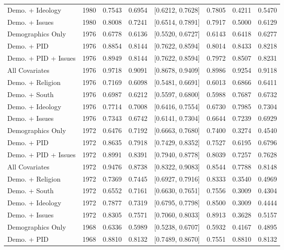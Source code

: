 \begin{longtable}{lrrrlrrr}
  Demo. + Ideology & 1980 & 0.7543 & 0.6954 & [0.6212, 0.7628] & 0.7805 & 0.4211 & 0.5470 \\ 
  Demo. + Issues & 1980 & 0.8008 & 0.7241 & [0.6514, 0.7891] & 0.7917 & 0.5000 & 0.6129 \\ 
  Demographics Only & 1976 & 0.6778 & 0.6136 & [0.5520, 0.6727] & 0.6143 & 0.6418 & 0.6277 \\ 
  Demo. + PID & 1976 & 0.8854 & 0.8144 & [0.7622, 0.8594] & 0.8014 & 0.8433 & 0.8218 \\ 
  Demo. + PID + Issues & 1976 & 0.8949 & 0.8144 & [0.7622, 0.8594] & 0.7972 & 0.8507 & 0.8231 \\ 
  All Covariates & 1976 & 0.9718 & 0.9091 & [0.8678, 0.9409] & 0.8986 & 0.9254 & 0.9118 \\ 
  Demo. + Religion & 1976 & 0.7169 & 0.6098 & [0.5481, 0.6691] & 0.6013 & 0.6866 & 0.6411 \\ 
  Demo. + South & 1976 & 0.6987 & 0.6212 & [0.5597, 0.6800] & 0.5988 & 0.7687 & 0.6732 \\ 
  Demo. + Ideology & 1976 & 0.7714 & 0.7008 & [0.6416, 0.7554] & 0.6730 & 0.7985 & 0.7304 \\ 
  Demo. + Issues & 1976 & 0.7343 & 0.6742 & [0.6141, 0.7304] & 0.6644 & 0.7239 & 0.6929 \\ 
  Demographics Only & 1972 & 0.6476 & 0.7192 & [0.6663, 0.7680] & 0.7400 & 0.3274 & 0.4540 \\ 
  Demo. + PID & 1972 & 0.8635 & 0.7918 & [0.7429, 0.8352] & 0.7527 & 0.6195 & 0.6796 \\ 
  Demo. + PID + Issues & 1972 & 0.8991 & 0.8391 & [0.7940, 0.8778] & 0.8039 & 0.7257 & 0.7628 \\ 
  All Covariates & 1972 & 0.9476 & 0.8738 & [0.8322, 0.9083] & 0.8544 & 0.7788 & 0.8148 \\ 
  Demo. + Religion & 1972 & 0.7369 & 0.7445 & [0.6927, 0.7916] & 0.8333 & 0.3540 & 0.4969 \\ 
  Demo. + South & 1972 & 0.6552 & 0.7161 & [0.6630, 0.7651] & 0.7556 & 0.3009 & 0.4304 \\ 
  Demo. + Ideology & 1972 & 0.7877 & 0.7319 & [0.6795, 0.7798] & 0.8500 & 0.3009 & 0.4444 \\ 
  Demo. + Issues & 1972 & 0.8305 & 0.7571 & [0.7060, 0.8033] & 0.8913 & 0.3628 & 0.5157 \\ 
  Demographics Only & 1968 & 0.6336 & 0.5989 & [0.5238, 0.6707] & 0.5932 & 0.4167 & 0.4895 \\ 
  Demo. + PID & 1968 & 0.8810 & 0.8132 & [0.7489, 0.8670] & 0.7551 & 0.8810 & 0.8132 \\ 

\end{longtable}
